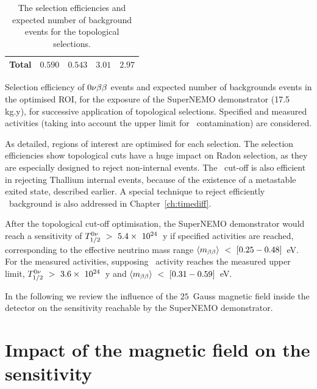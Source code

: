 \begin{table}[h]
\begin{subtable}[h]{1.\textwidth}
\begin{tabular}{|c|c|c|c|c|}
      Total & $0.590$ & $0.543$ & $3.01$ & $2.97$ \\
      \hline
    \end{tabular}
    \captionsetup{justification=justified}
    \caption{Selection efficiency of $0\nu\beta\beta$ events and expected number of backgrounds events in the optimised ROI, for the exposure of the SuperNEMO demonstrator (17.5 kg.y), for successive application of topological selections.
      Specified and measured activities (taking into account the upper limit for \Bi\ contamination) are considered.
      \label{tab:Nexp_topo_contamination}}
  \end{subtable}
  \caption{The selection efficiencies and expected number of background events for the topological selections.}
\end{table}
As detailed, regions of interest are optimised for each selection.
The selection efficiencies show topological cuts have a huge impact on Radon selection, as they are especially designed to reject non-internal events.
The \Pint\ cut-off is also efficient in rejecting Thallium internal events, because of the existence of a metastable exited state, described earlier.
A special technique to reject efficiently \Tl\ background is also addressed in Chapter~\ref{ch:timediff}.

After the topological cut-off optimisation, the SuperNEMO demonstrator would reach a sensitivity of $T_{1/2}^{0\nu}~>~5.4\times~10^{24}$~y if specified activities are reached, corresponding to the effective neutrino mass range $\langle m_{\beta\beta}\rangle~<~[0.25-0.48]$~eV.
For the measured activities, supposing \Bi\ activity reaches the measured upper limit, $T_{1/2}^{0\nu}~>~3.6\times~10^{24}$~y and $\langle m_{\beta\beta}\rangle~<~[0.31-0.59]$~eV.

In the following we review the influence of the $25$~Gauss magnetic field inside the detector on the sensitivity reachable by the SuperNEMO demonstrator.

\section{Impact of the magnetic field on the sensitivity}
\label{subsec:field}

